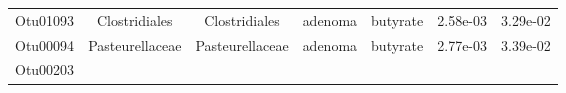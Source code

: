 \documentclass[11pt,]{article}
\begin{document}
\begin{longtable}[]{@{}ccccccc@{}}
\begin{minipage}[t]{0.09\columnwidth}\centering\strut
Otu01093\strut
\end{minipage} & \begin{minipage}[t]{0.17\columnwidth}\centering\strut
Clostridiales\strut
\end{minipage} & \begin{minipage}[t]{0.17\columnwidth}\centering\strut
Clostridiales\strut
\end{minipage} & \begin{minipage}[t]{0.09\columnwidth}\centering\strut
adenoma\strut
\end{minipage} & \begin{minipage}[t]{0.11\columnwidth}\centering\strut
butyrate\strut
\end{minipage} & \begin{minipage}[t]{0.09\columnwidth}\centering\strut
2.58e-03\strut
\end{minipage} & \begin{minipage}[t]{0.09\columnwidth}\centering\strut
3.29e-02\strut
\end{minipage}\tabularnewline
\begin{minipage}[t]{0.09\columnwidth}\centering\strut
Otu00094\strut
\end{minipage} & \begin{minipage}[t]{0.17\columnwidth}\centering\strut
Pasteurellaceae\strut
\end{minipage} & \begin{minipage}[t]{0.17\columnwidth}\centering\strut
Pasteurellaceae\strut
\end{minipage} & \begin{minipage}[t]{0.09\columnwidth}\centering\strut
adenoma\strut
\end{minipage} & \begin{minipage}[t]{0.11\columnwidth}\centering\strut
butyrate\strut
\end{minipage} & \begin{minipage}[t]{0.09\columnwidth}\centering\strut
2.77e-03\strut
\end{minipage} & \begin{minipage}[t]{0.09\columnwidth}\centering\strut
3.39e-02\strut
\end{minipage}\tabularnewline
\begin{minipage}[t]{0.09\columnwidth}\centering\strut
Otu00203\strut
\end{minipage} & \begin{minipage}[t]{0.17\columnwidth}\centering\strut

\end{minipage}
\end{longtable}
\end{document}
